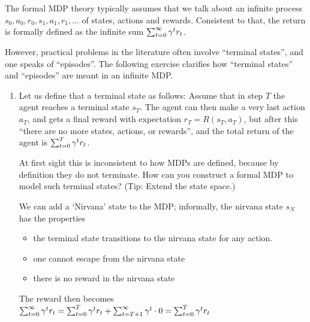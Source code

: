 
The formal MDP theory typically assumes that we talk about an infinite process\\ $s_0,a_0,r_0,s_1,a_1,r_1,...$ of states, actions and rewards. Consistent to that, the return is formally defined as the infinite sum $\sum_{t=0}^\infty \gamma^t r_t$.

However, practical problems in the literature often involve ``terminal states'', and one speaks of ``episodes''. The following exercise clarifies how ``terminal states'' and ``episodes'' are meant in an infinite MDP.

\begin{enumerate}
\item Let us define that a terminal state as follows: Assume that in step $T$ the agent reaches a terminal state $s_T$. The agent can then make a very last action $a_T$, and gets a final reward with expectation $r_T = R(s_T, a_T)$, but after this ``there are no more states, actions, or rewards'', and the total return of the agent is $\sum_{t=0}^T \gamma^t r_t$.

At first sight this is inconsistent to how MDPs are defined, because by definition they do not terminate. How can you construct a formal MDP to model such terminal states? (Tip: Extend the state space.)

\begin{solution}
We can add a `Nirvana' state to the MDP; informally, the nirvana state $s_N$ has the properties
    \begin{itemize}
        \item the terminal state transitions to the nirvana state for any action.
        \item one cannot escape from the nirvana state
        \item there is no reward in the nirvana state
    \end{itemize}

    The reward then becomes $\sum_{t=0}^\infty \gamma^t r_t = \sum_{t=0}^T \gamma^t r_t + \sum_{t=T+1}^\infty \gamma^t \cdot 0 = \sum_{t=0}^T \gamma^t r_t$
\end{solution}


\end{enumerate}
